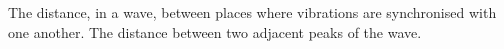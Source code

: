 The distance, in a wave, between places where 
vibrations are synchronised with one another.
The distance between two adjacent peaks of the wave.